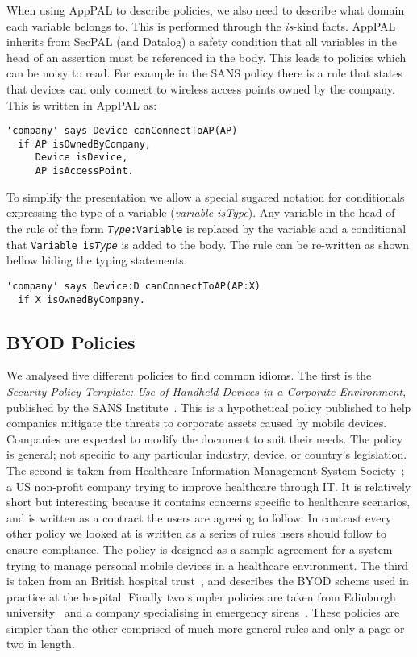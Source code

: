 \documentclass{easychair}
\begin{document}
When using AppPAL to describe policies, we also need to describe what domain each variable belongs to.
This is performed through the \emph{is}-kind facts.
AppPAL inherits from SecPAL (and Datalog) a safety condition that all variables in the head of an assertion must be referenced in the body.
This leads to policies which can be noisy to read.
For example in the SANS policy there is a rule that states that devices can only connect to wireless access points owned by the company.
This is written in AppPAL as:
\begin{lstlisting}
'company' says Device canConnectToAP(AP)
  if AP isOwnedByCompany,
     Device isDevice,
     AP isAccessPoint.
\end{lstlisting}
To simplify the presentation we allow a special sugared notation for conditionals expressing the type of a variable (\emph{variable \emph{is}Type}).
Any variable in the head of the rule of the form \texttt{\emph{Type}:Variable} is replaced by the variable and a conditional that \texttt{Variable is\emph{Type}} is added to the body.
The rule can be re-written as shown bellow hiding the typing statements.
\begin{lstlisting}
'company' says Device:D canConnectToAP(AP:X)
  if X isOwnedByCompany.
\end{lstlisting}

\subsection{BYOD Policies}

We analysed five different policies to find common idioms.
The first is the \emph{Security Policy Template: Use of Handheld Devices in a Corporate Environment}, published by the SANS Institute~\cite{nicholas_r._c._guerin_security_2008}.
This is a hypothetical policy published to help companies mitigate the threats to corporate assets caused by mobile devices.
Companies are expected to modify the document to suit their needs.
The policy is general; not specific to any particular industry, device, or country's legislation.
The second is taken from Healthcare Information Management System Society~\cite{healthcare_information_and_management_systems_society_mobile_2012};
  a US non-profit company trying to improve healthcare through IT.
It is relatively short but interesting because it contains concerns specific to healthcare scenarios, and is written as a contract the users are agreeing to follow.
In contrast every other policy we looked at is written as a series of rules users should follow to ensure compliance.
The policy is designed as a sample agreement for a system trying to manage personal mobile devices in a healthcare environment.
The third is taken from an British hospital trust~\cite{kennington_mobiles_2014}, and describes the BYOD scheme used in practice at the hospital.
Finally two simpler policies are taken from Edinburgh university~\cite{david_williamson_bring_2015} and a company specialising in emergency sirens~\cite{code3pse.org_sample_????}.
These policies are simpler than the other comprised of much more general rules and only a page or two in length.
\end{document}
